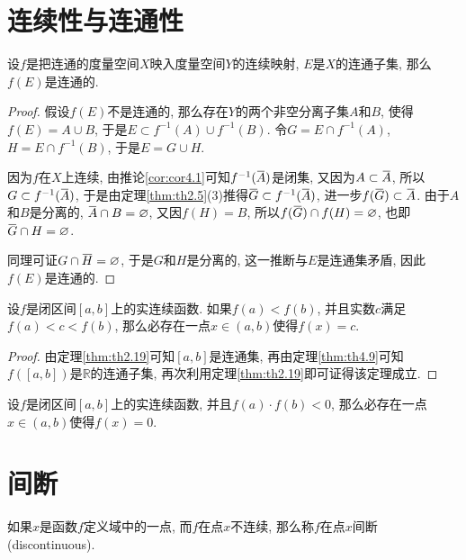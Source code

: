 \documentclass[cn,12pt,math=mtpro2,citestyle=gb7714-2015,bibstyle=gb7714-2015,twocol]{elegantbook}
\newcommand{\R}{\mathbb{R}}
\newcommand{\overbar}[1]{\mkern 1.5mu\overline{\mkern-1.5mu#1\mkern-1.5mu}\mkern 1.5mu}
\let\emptyset\varnothing
\begin{document}
\section{连续性与连通性}
\begin{theorem}\label{thm:th4.9}
  设$f$是把连通的度量空间$X$映入度量空间$Y$的连续映射, $E$是$X$的连通子集, 那么$f(E)$是连通的.
\end{theorem}
\begin{proof}
  假设$f(E)$不是连通的, 那么存在$Y$的两个非空分离子集$A$和$B$, 使得$f(E)=A\cup B$, 于是$E\subset f^{-1}(A)\cup f^{-1}(B)$. 令$G=E\cap f^{-1}(A)$, $H=E\cap f^{-1}(B)$, 于是$E=G\cup H$.

  因为$f$在$X$上连续, 由推论\ref{cor:cor4.1}可知$f^{-1}(\overbar{A})$是闭集, 又因为$A\subset\overbar{A}$, 所以$G\subset f^{-1}(\overbar{A})$, 于是由定理\ref{thm:th2.5}(3)推得$\overbar{G}\subset f^{-1}(\overbar{A})$, 进一步$f(\overbar{G})\subset \overbar{A}$. 由于$A$和$B$是分离的, $\overbar{A}\cap B=\emptyset$, 又因$f(H)=B$, 所以$f(\overbar{G})\cap f(H)=\emptyset$, 也即$\overbar{G}\cap H=\emptyset$.

  同理可证$G\cap\overbar{H}=\emptyset$, 于是$G$和$H$是分离的, 这一推断与$E$是连通集矛盾, 因此$f(E)$是连通的.


\end{proof}
\begin{theorem}[介值定理]\label{thm:th4.11}
  设$f$是闭区间$[a,b]$上的实连续函数. 如果$f(a)<f(b)$, 并且实数$c$满足$f(a)<c<f(b)$, 那么必存在一点$x\in (a,b)$使得$f(x)=c$.
\end{theorem}
\begin{proof}
  由定理\ref{thm:th2.19}可知$[a,b]$是连通集, 再由定理\ref{thm:th4.9}可知$f([a,b])$是$\R$的连通子集, 再次利用定理\ref{thm:th2.19}即可证得该定理成立.


\end{proof}
\begin{corollary}[零点存在定理]
  设$f$是闭区间$[a,b]$上的实连续函数, 并且$f(a)\cdot f(b)<0$, 那么必存在一点$x\in (a,b)$使得$f(x)=0$.
\end{corollary}



\section{间断}
\begin{definition}
如果$x$是函数$f$定义域中的一点, 而$f$在点$x$不连续, 那么称$f$在点$x$间断 (discontinuous).
\end{definition}
\end{document}
